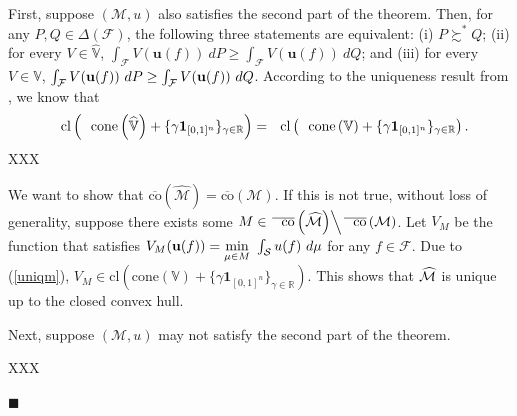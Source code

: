 \documentclass[12pt, notitlepage]{article}
\begin{document}
First, suppose $(\mathcal{M},u)$ also satisfies the second part of the
theorem. Then, for any $P,Q\in \Delta (\mathcal{F})$, the following three
statements are equivalent: (\textrm{i}) $P\succsim ^{\ast }Q$; (\textrm{ii})
for every $V\in \widehat{\mathbb{V}}$, $\int_{\mathcal{F}}V(\mathbf{u}%
(f))~dP\geq \int_{\mathcal{F}}V(\mathbf{u}(f))~dQ$; and (\textrm{iii}) for
every $V\in \mathbb{V}$, $\int_{\mathcal{F}}V(\mathbf{u}(f))~dP\geq \int_{%
\mathcal{F}}V(\mathbf{u}(f))~dQ$. According to the uniqueness result from 
\cite{DubraMaccheroniOk04}, we know that%
\begin{equation}
\text{cl}\left( \text{cone}\left( \widehat{\mathbb{V}}\right) +\{\gamma 
\mathbf{1}_{[0,1]^{n}}\}_{\gamma \in \mathbb{R}}\right) =\text{cl}\left( 
\text{cone}\left( \mathbb{V}\right) +\{\gamma \mathbf{1}_{[0,1]^{n}}\}_{%
\gamma \in \mathbb{R}}\right) .  \label{uniqm}
\end{equation}%
XXX

We want to show that $\overline{\text{co}}\left( \widehat{\mathcal{M}}%
\right) =\overline{\text{co}}\left( \mathcal{M}\right) $. If this is not
true, without loss of generality, suppose there exists some $M\in \left. 
\overline{\text{co}}\left( \widehat{\mathcal{M}}\right) \right\backslash 
\overline{\text{co}}\left( \mathcal{M}\right) $. Let $V_{M}$ be the function
that satisfies $V_{M}(\mathbf{u}(f))=\underset{\mu \in M}{\min }~\int_{%
\mathcal{S}}u(f)~d\mu $ for any $f\in \mathcal{F}$. Due to (\ref{uniqm}), $%
V_{M}\in $cl$\left( \text{cone}\left( \mathbb{V}\right) +\{\gamma \mathbf{1}%
_{[0,1]^{n}}\}_{\gamma \in \mathbb{R}}\right) $. This shows that $\widehat{%
\mathcal{M}}$ is unique up to the closed convex hull.

Next, suppose $(\mathcal{M},u)$ may not satisfy the second part of the
theorem.

XXX

\begin{flushleft}
{$\blacksquare $\linebreak }
\end{flushleft}
\end{document}
